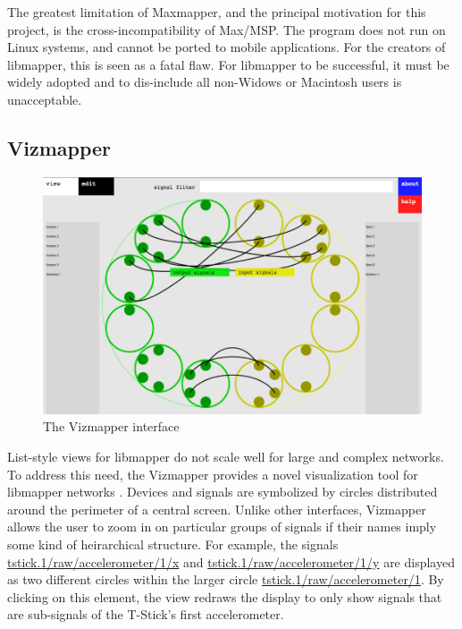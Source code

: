 The greatest limitation of Maxmapper, and the principal motivation for this project, is the cross-incompatibility of Max/MSP. The program does not run on Linux systems, and cannot be ported to mobile applications. For the creators of libmapper, this is seen as a fatal flaw. For libmapper to be successful, it must be widely adopted and to dis-include all non-Widows or Macintosh users is unacceptable.

	\subsection{Vizmapper} %
	\label{sub:vizmapper}

\begin{figure}[ht]
	\centering
	\includegraphics[width=\textwidth]{figures/vizmapper2}
	\caption{The Vizmapper interface}
	\label{fig:vizmapper}
\end{figure}

List-style views for libmapper do not scale well for large and complex networks. To address this need, the Vizmapper provides a novel visualization tool for libmapper networks \cite{vizmapper}. Devices and signals are symbolized by circles distributed around the perimeter of a central screen. Unlike other interfaces, Vizmapper allows the user to zoom in on particular groups of signals if their names imply some kind of heirarchical structure. For example, the signals \url{tstick.1/raw/accelerometer/1/x} and \url{tstick.1/raw/accelerometer/1/y} are displayed as two different circles within the larger circle \url{tstick.1/raw/accelerometer/1}. By clicking on this element, the view redraws the display to only show signals that are sub-signals of the T-Stick's first accelerometer. 

